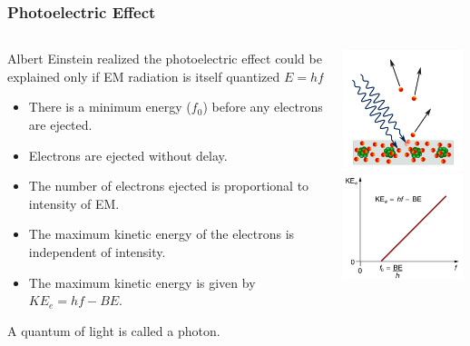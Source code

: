 \documentclass{beamer}
\begin{document}
\begin{frame}\frametitle{Photoelectric Effect}
\begin{columns}
\begin{column}{7.5cm}
Albert Einstein realized the photoelectric effect could be explained only if EM radiation is itself quantized $E = hf$
\begin{itemize}
\item There is a minimum energy ($f_0$) before any electrons are ejected.
\item Electrons are ejected without delay.
\item The number of electrons ejected is proportional to intensity of EM.
\item The maximum kinetic energy of the electrons is independent of intensity.
\item The maximum kinetic energy is given by $KE_e = hf - BE$. 
\end{itemize}
A quantum of light is called a photon.
\end{column}
\begin{column}{4cm}
\begin{center}
\includegraphics[width=3.5cm]{fig/photoelectric.png}
\includegraphics[width=3.5cm]{fig/photoelectric2.jpg}
\end{center}
\end{column}
\end{columns}
\end{frame}
\end{document}

